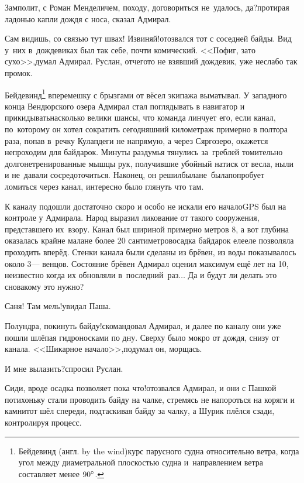\diagdash Замполит, с Роман Менделичем, походу, договориться не~удалось, да?\mdash протирая ладонью капли дождя с носа, сказал Адмирал.

\diagdash Сам видишь, со связью тут швах! Извиняй!\mdash отозвался тот с соседней байды. Вид у~них в~дождевиках был так себе, почти комический. <<Пофиг, зато сухо>>,\mdash думал Адмирал. Руслан, отчего\sdash то не взявший дождевик, уже неслабо так промок.

\renewcommand*{\thefootnote}{\fnsymbol{footnote}}
\setcounter{footnote}{0}
Бейдевинд\footnote{Бейдевинд (англ. by the wind)\mdash курс парусного судна относительно ветра, когда угол между диаметральной плоскостью судна и~направлением ветра составляет менее $90\degree$\cite{МорскойСправочник}.} вперемешку с брызгами от вёсел экипажа выматывал. У западного конца Вендюрского озера Адмирал стал поглядывать в навигатор и прикидывать\mdash насколько велики шансы, что команда линчует его, если канал, по~которому он хотел сократить сегодняшний километраж примерно в полтора раза, попав в~речку Кулапдеги не напрямую, а через Сяргозеро, окажется непроходим для байдарок. Минуты раздумья тянулись за~греблей томительно долго\mdash нетренированные мышцы рук, получившие убойный натиск от весла, ныли и не~давали сосредоточиться. Наконец, он решил\mdash была\sdash не~была\mdash попробует ломиться через канал, интересно было глянуть что там.

К каналу подошли достаточно скоро и особо не искали его начало\mdash GPS был на контроле у Адмирала. Народ выразил ликование от такого сооружения, представшего их~взору. Канал был шириной примерно метров 8, а вот глубина оказалась крайне мала\mdash не более 20 сантиметров\mdash осадка байдарок еле\sdash еле позволяла проходить вперёд. Стенки канала были сделаны из брёвен, из воды показывалось около 3\thinspace\nobreakdash--- венцов. Состояние брёвен Адмирал оценил максимум ещё лет на 10, неизвестно когда их обновляли в~последний~раз$\ldots$ Да и будут ли делать это снова\mdash кому это нужно?

\diagdash Саня! Там мель!\mdash увидал Паша. 

\diagdash Полундра, покинуть байду!\mdash скомандовал Адмирал, и далее по каналу они уже пошли шлёпая гидроносками по дну. Сверху было мокро от дождя, снизу от канала. <<Шикарное начало>>,\mdash подумал он, морщась.

\diagdash И мне вылазить?\mdash спросил Руслан. 

\diagdash Сиди, вроде осадка позволяет пока что!\mdash отозвался Адмирал, и они с Пашкой потихоньку стали проводить байду на чалке, стремясь не напороться на коряги и камни\mdash тот шёл спереди, подтаскивая байду за чалку, а Шурик плёлся сзади, контролируя процесс.

